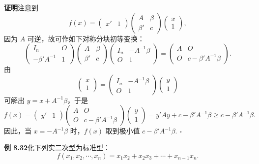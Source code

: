 \documentclass[UTF8, 12pt, fontset=fandol, oneside]{ctexart}
\begin{document}
\noindent\textbf{证明}\quad 注意到
\[
f(x)=\left(\begin{array}{cc}x'&1\end{array}\right)
\left(\begin{array}{cc}
A & \beta\\
\beta' & c
\end{array}\right)
\left(\begin{array}{c}
x\\
1
\end{array}\right),
\]
因为 $A$ 可逆，故可作如下对称分块初等变换：
\[
\left(\begin{array}{cc}
I_n & O\\
-\beta'A^{-1} & 1
\end{array}\right)
\left(\begin{array}{cc}
A & \beta\\
\beta' & c
\end{array}\right)
\left(\begin{array}{cc}
I_n & -A^{-1}\beta\\
O & 1
\end{array}\right)
=
\left(\begin{array}{cc}
A & O\\
O & c-\beta'A^{-1}\beta
\end{array}\right).
\]
由
\[
\left(\begin{array}{c}
x\\
1
\end{array}\right)
=
\left(\begin{array}{cc}
I_n & -A^{-1}\beta\\
O & 1
\end{array}\right)
\left(\begin{array}{c}
y\\
1
\end{array}\right)
\]
可解出 $y=x+A^{-1}\beta$，于是
\[
f(x)=\left(\begin{array}{cc}y'&1\end{array}\right)
\left(\begin{array}{cc}
A & O\\
O & c-\beta'A^{-1}\beta
\end{array}\right)
\left(\begin{array}{c}
y\\
1
\end{array}\right)
=y'Ay+c-\beta'A^{-1}\beta\ge c-\beta'A^{-1}\beta.
\]
因此，当 $x=-A^{-1}\beta$ 时，$f(x)$ 取到极小值 $c-\beta'A^{-1}\beta$. $\ensuremath{\square}$

\noindent\textbf{例 8.32}\quad 化下列实二次型为标准型：
\[
f(x_1,x_2,\cdots,x_n)=x_1x_2+x_2x_3+\cdots+x_{n-1}x_n.
\]
\end{document}
